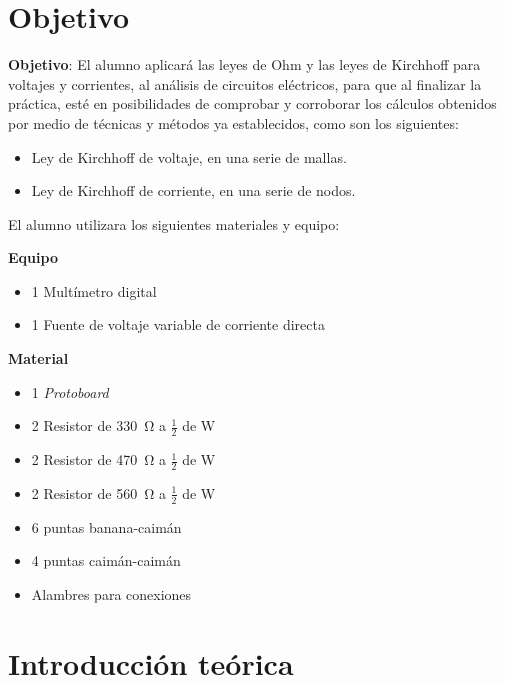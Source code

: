 \documentclass[a4paper,12pt]{article}
\begin{document}

\section*{Objetivo}

\textbf{Objetivo}: El alumno aplicará las leyes de Ohm y las leyes de Kirchhoff para voltajes y corrientes, al análisis de circuitos eléctricos, para que al finalizar la práctica, esté en posibilidades de comprobar y corroborar los cálculos obtenidos por medio de técnicas y métodos ya establecidos, como son los siguientes:\par

\begin{itemize}
	\item Ley de Kirchhoff de voltaje, en una serie de mallas.
	\item Ley de Kirchhoff de corriente, en una serie de nodos.
\end{itemize}


El alumno utilizara los siguientes materiales y equipo:

\begin{multicols}{2}
\textbf{Equipo}\\
\begin{itemize}[nosep]
	\item 1 Multímetro digital
	\item 1 Fuente de voltaje variable de corriente directa
\end{itemize}

\columnbreak

\textbf{Material}\\
\begin{itemize}[nosep]
	\item 1 \textit{Protoboard}
	\item 2 Resistor de \SI{330}{\ohm} a $\frac{1}{2}$ de \si{\watt}
	\item 2 Resistor de \SI{470}{\ohm} a $\frac{1}{2}$ de \si{\watt}
	\item 2 Resistor de \SI{560}{\ohm} a $\frac{1}{2}$ de \si{\watt}
	\item 6 puntas banana-caimán
	\item 4 puntas caimán-caimán
	\item Alambres para conexiones
\end{itemize}

\end{multicols}

\section{Introducción teórica}
\end{document}

